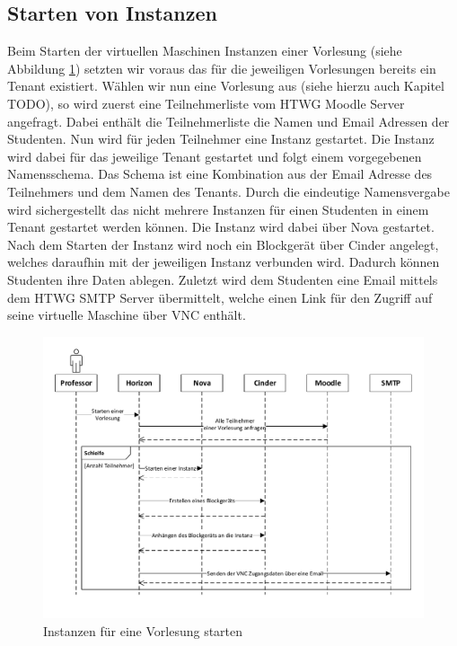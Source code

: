 \subsection{Starten von Instanzen}
Beim Starten der virtuellen Maschinen Instanzen einer Vorlesung 
(siehe Abbildung \ref{startInstances}) setzten wir voraus das für
die jeweiligen Vorlesungen bereits ein Tenant existiert. Wählen wir nun eine Vorlesung aus
(siehe hierzu auch Kapitel TODO), so wird zuerst eine Teilnehmerliste vom HTWG Moodle Server
angefragt. Dabei enthält die Teilnehmerliste die Namen und Email Adressen der Studenten.
Nun wird für jeden Teilnehmer eine Instanz gestartet. Die Instanz wird dabei für das jeweilige
Tenant gestartet und folgt einem vorgegebenen Namensschema. Das Schema ist eine Kombination
aus der Email Adresse des Teilnehmers und dem Namen des Tenants. Durch die eindeutige Namensvergabe
wird sichergestellt das nicht mehrere Instanzen für einen Studenten in einem Tenant gestartet
werden können.
Die Instanz wird dabei über Nova gestartet. Nach dem Starten der Instanz wird noch ein Blockgerät
über Cinder angelegt, welches daraufhin mit der jeweiligen Instanz verbunden wird. Dadurch können
Studenten ihre Daten ablegen.
Zuletzt wird dem Studenten eine Email mittels dem HTWG SMTP Server übermittelt, welche einen
Link für den Zugriff auf seine virtuelle Maschine über VNC enthält.

\begin{figure}[H]
	\centering
	\includegraphics[scale=0.6]{img/startInstances.pdf}
\caption{Instanzen für eine Vorlesung starten}
\label{startInstances}
\FloatBarrier
\end{figure}

